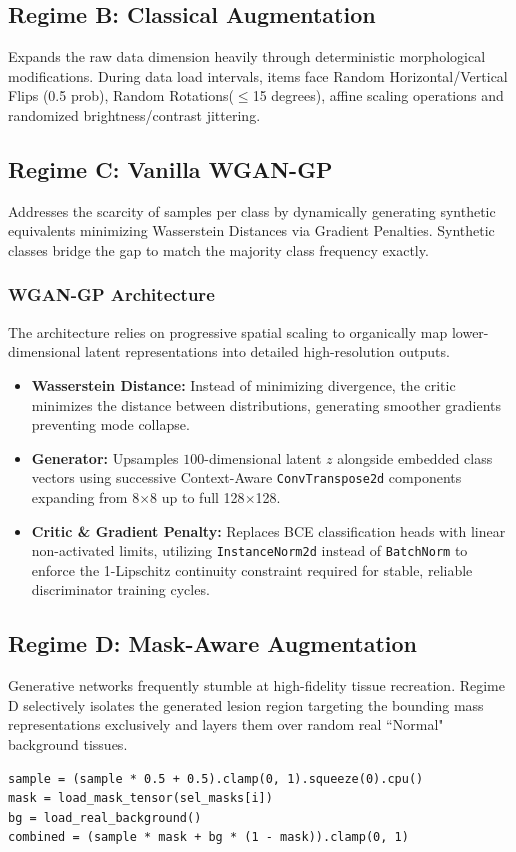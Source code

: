 \documentclass[12pt,a4paper]{article}
\begin{document}
\subsection{Regime B: Classical Augmentation}
Expands the raw data dimension heavily through deterministic morphological modifications. During data load intervals, items face Random Horizontal/Vertical Flips (0.5 prob), Random Rotations($\leq$15 degrees), affine scaling operations and randomized brightness/contrast jittering.

\subsection{Regime C: Vanilla WGAN-GP}
Addresses the scarcity of samples per class by dynamically generating synthetic equivalents minimizing Wasserstein Distances via Gradient Penalties. Synthetic classes bridge the gap to match the majority class frequency exactly.

\subsubsection{WGAN-GP Architecture}
The architecture relies on progressive spatial scaling to organically map lower-dimensional latent representations into detailed high-resolution outputs.
\begin{itemize}
    \item \textbf{Wasserstein Distance:} Instead of minimizing divergence, the critic minimizes the distance between distributions, generating smoother gradients preventing mode collapse.
    \item \textbf{Generator:} Upsamples $100$-dimensional latent $z$ alongside embedded class vectors using successive Context-Aware \texttt{ConvTranspose2d} components expanding from 8$\times$8 up to full 128$\times$128.
    \item \textbf{Critic \& Gradient Penalty:} Replaces BCE classification heads with linear non-activated limits, utilizing \texttt{InstanceNorm2d} instead of \texttt{BatchNorm} to enforce the 1-Lipschitz continuity constraint required for stable, reliable discriminator training cycles.
\end{itemize}

\subsection{Regime D: Mask-Aware Augmentation}
Generative networks frequently stumble at high-fidelity tissue recreation. Regime D selectively isolates the generated lesion region targeting the bounding mass representations exclusively and layers them over random real ``Normal" background tissues.
\begin{lstlisting}[caption={Mask-aware blending mechanism.}, label=lst:mask]
sample = (sample * 0.5 + 0.5).clamp(0, 1).squeeze(0).cpu()
mask = load_mask_tensor(sel_masks[i])
bg = load_real_background()
combined = (sample * mask + bg * (1 - mask)).clamp(0, 1)
\end{lstlisting}
\end{document}
